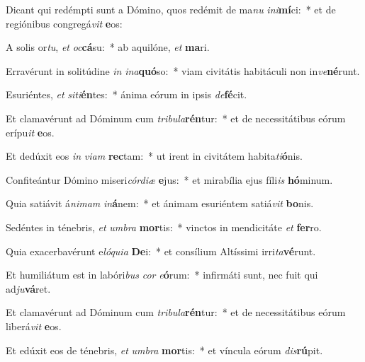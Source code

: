 \item Dicant qui redémpti sunt a Dómino, quos redémit de ma\textit{nu} \textit{in}\textit{i}\textbf{mí}ci:~* et de regiónibus congregá\textit{vit} \textbf{e}os:
\item A solis or\textit{tu}, \textit{et} \textit{oc}\textbf{cá}su:~* ab aquilóne, \textit{et} \textbf{ma}ri.
\item Erravérunt in solitúdine \textit{in} \textit{in}\textit{a}\textbf{quó}so:~* viam civitátis habitáculi non in\textit{ve}\textbf{né}runt.
\item Esuriéntes, \textit{et} \textit{si}\textit{ti}\textbf{én}tes:~* ánima eórum in ipsis \textit{de}\textbf{fé}cit.
\item Et clamavérunt ad Dóminum cum \textit{tri}\textit{bu}\textit{la}\textbf{rén}tur:~* et de necessitátibus eórum erípu\textit{it} \textbf{e}os.
\item Et dedúxit eos \textit{in} \textit{vi}\textit{am} \textbf{rec}tam:~* ut irent in civitátem habita\textit{ti}\textbf{ó}nis.
\item Confiteántur Dómino miseri\textit{cór}\textit{di}\textit{æ} \textbf{e}jus:~* et mirabília ejus fíli\textit{is} \textbf{hó}minum.
\item Quia satiávit á\textit{ni}\textit{mam} \textit{in}\textbf{á}nem:~* et ánimam esuriéntem satiá\textit{vit} \textbf{bo}nis.
\item Sedéntes in ténebris, \textit{et} \textit{um}\textit{bra} \textbf{mor}tis:~* vinctos in mendicitáte \textit{et} \textbf{fer}ro.
\item Quia exacerbavérunt e\textit{ló}\textit{qui}\textit{a} \textbf{De}i:~* et consílium Altíssimi irri\textit{ta}\textbf{vé}runt.
\item Et humiliátum est in labóri\textit{bus} \textit{cor} \textit{e}\textbf{ó}rum:~* infirmáti sunt, nec fuit qui ad\textit{ju}\textbf{vá}ret.
\item Et clamavérunt ad Dóminum cum \textit{tri}\textit{bu}\textit{la}\textbf{rén}tur:~* et de necessitátibus eórum liberá\textit{vit} \textbf{e}os.
\item Et edúxit eos de ténebris, \textit{et} \textit{um}\textit{bra} \textbf{mor}tis:~* et víncula eórum \textit{dis}\textbf{rú}pit.
